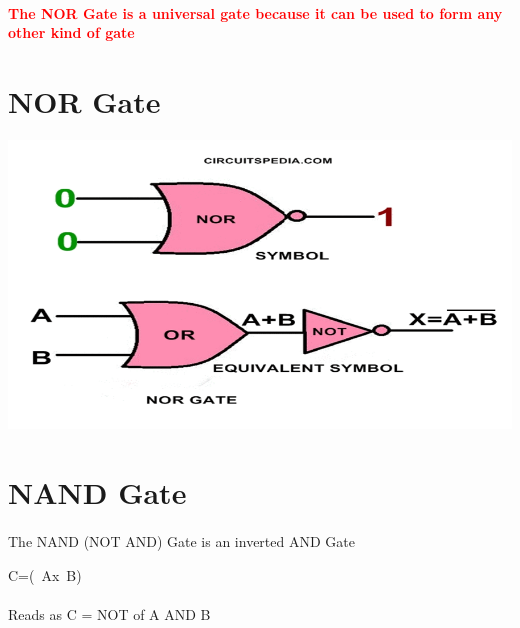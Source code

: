 \documentclass{article}
\begin{document}
\paragraph{}
\textcolor{red}{\textbf{The NOR Gate is a universal gate because it can be used to form any other kind of gate }}
\section{NOR Gate}
\includegraphics[width=1.2\linewidth]{norm}

\section{NAND Gate}
\paragraph{}
The NAND (NOT AND) Gate is an inverted AND Gate

\begin{center}
	C=(~Ax~B)
\end{center}
\paragraph{}
Reads as C = NOT of A AND B
\\
\end{document}
